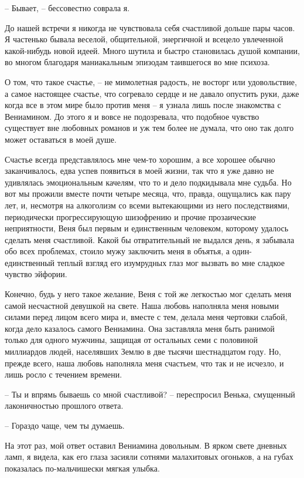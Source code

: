 \documentclass[
]{book}
\begin{document}
-- Бывает, -- бессовестно соврала я.

До нашей встречи я никогда не чувствовала себя счастливой дольше пары часов. Я частенько бывала веселой, общительной, энергичной и всецело увлеченной какой-нибудь новой идеей. Много шутила и быстро становилась душой компании, во многом благодаря маниакальным эпизодам таившегося во мне психоза.

О том, что такое счастье, -- не мимолетная радость, не восторг или удовольствие, а самое настоящее счастье, что согревало сердце и не давало опустить руки, даже когда все в этом мире было против меня -- я узнала лишь после знакомства с Вениамином. До этого я и вовсе не подозревала, что подобное чувство существует вне любовных романов и уж тем более не думала, что оно так долго может оставаться в моей душе.

Счастье всегда представлялось мне чем-то хорошим, а все хорошее обычно заканчивалось, едва успев появиться в моей жизни, так что я уже давно не удивлялась эмоциональным качелям, что то и дело подкидывала мне судьба. Но вот мы прожили вместе почти четыре месяца, что, правда, ощущались как пару лет, и, несмотря на алкоголизм со всеми вытекающими из него последствиями, периодически прогрессирующую шизофрению и прочие прозаические неприятности, Веня был первым и единственным человеком, которому удалось сделать меня счастливой. Какой бы отвратительный не выдался день, я забывала обо всех проблемах, стоило мужу заключить меня в объятья, а один-единственный теплый взгляд его изумрудных глаз мог вызвать во мне сладкое чувство эйфории.

Конечно, будь у него такое желание, Веня с той же легкостью мог сделать меня самой несчастной девушкой на свете. Наша любовь наполняла меня новыми силами перед лицом всего мира и, вместе с тем, делала меня чертовки слабой, когда дело казалось самого Вениамина. Она заставляла меня быть ранимой только для одного мужчины, защищая от остальных семи с половиной миллиардов людей, населявших Землю в две тысячи шестнадцатом году. Но, прежде всего, наша любовь наполняла меня счастьем, что так и не исчезло, и лишь росло с течением времени.

-- Ты и впрямь бываешь со мной счастливой? -- переспросил Венька, смущенный лаконичностью прошлого ответа.

-- Гораздо чаще, чем ты думаешь.

На этот раз, мой ответ оставил Вениамина довольным. В ярком свете дневных ламп, я видела, как его глаза засияли сотнями малахитовых огоньков, а на губах показалась по-мальчишески мягкая улыбка.
\end{document}
